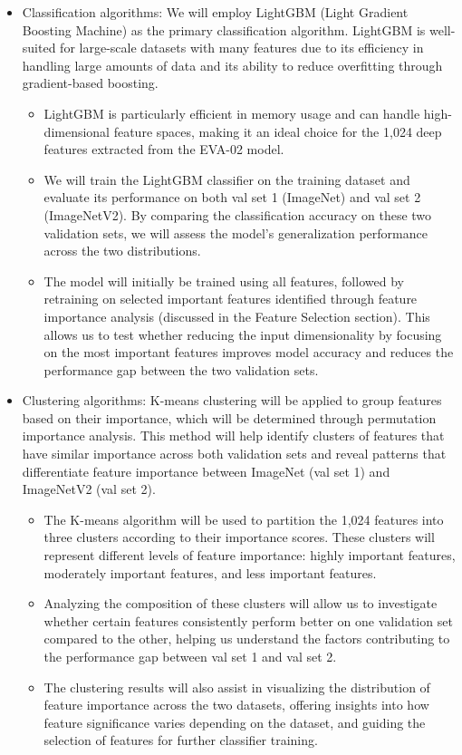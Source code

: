\documentclass[a4paper,11pt]{article}
\begin{document}
\begin{itemize}
    \item Classification algorithms: 
    We will employ LightGBM (Light Gradient Boosting Machine) as the primary classification algorithm. LightGBM is well-suited for large-scale datasets with many features due to its efficiency in handling large amounts of data and its ability to reduce overfitting through gradient-based boosting.  
    \begin{itemize}
        \item LightGBM is particularly efficient in memory usage and can handle high-dimensional feature spaces, making it an ideal choice for the 1,024 deep features extracted from the EVA-02 model. 
        \item We will train the LightGBM classifier on the training dataset and evaluate its performance on both val set 1 (ImageNet) and val set 2 (ImageNetV2). By comparing the classification accuracy on these two validation sets, we will assess the model’s generalization performance across the two distributions.  
        \item The model will initially be trained using all features, followed by retraining on selected important features identified through feature importance analysis (discussed in the Feature Selection section). This allows us to test whether reducing the input dimensionality by focusing on the most important features improves model accuracy and reduces the performance gap between the two validation sets.
    \end{itemize}
    
    \item Clustering algorithms:
    K-means clustering will be applied to group features based on their importance, which will be determined through permutation importance analysis. This method will help identify clusters of features that have similar importance across both validation sets and reveal patterns that differentiate feature importance between ImageNet (val set 1) and ImageNetV2 (val set 2).  
    \begin{itemize}
        \item The K-means algorithm will be used to partition the 1,024 features into three clusters according to their importance scores. These clusters will represent different levels of feature importance: highly important features, moderately important features, and less important features.  
        \item Analyzing the composition of these clusters will allow us to investigate whether certain features consistently perform better on one validation set compared to the other, helping us understand the factors contributing to the performance gap between val set 1 and val set 2.
        \item The clustering results will also assist in visualizing the distribution of feature importance across the two datasets, offering insights into how feature significance varies depending on the dataset, and guiding the selection of features for further classifier training.
    \end{itemize}
\end{itemize}
\end{document}

